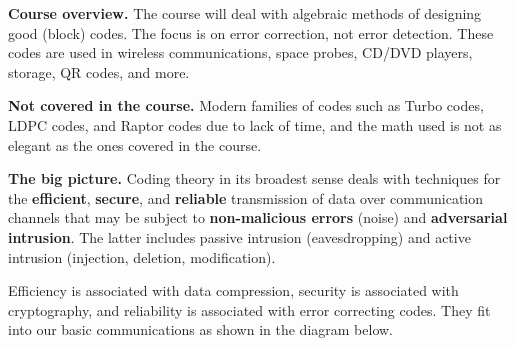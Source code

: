 \documentclass[10pt]{article}
\theoremstyle{newstyle}
\begin{document}
{\bf Course overview.} The course will deal with algebraic methods of designing good 
(block) codes. The focus is on error correction, not error detection. These codes are used 
in wireless communications, space probes, CD/DVD players, storage, QR codes, and more. 

{\bf Not covered in the course.} Modern families of codes such as Turbo codes, LDPC codes, and Raptor
codes due to lack of time, and the math used is not as elegant as the ones covered in the course.

{\bf The big picture.} Coding theory in its broadest sense deals with techniques for the 
{\bf efficient}, {\bf secure}, and {\bf reliable} transmission of data over communication channels 
that may be subject to {\bf non-malicious errors} (noise) and {\bf adversarial intrusion}. 
The latter includes passive intrusion (eavesdropping) and active intrusion (injection, 
deletion, modification).

Efficiency is associated with data compression, security is associated with cryptography, 
and reliability is associated with error correcting codes. They fit into our 
basic communications as shown in the diagram below.

\end{document}
